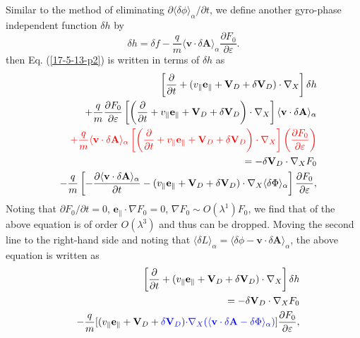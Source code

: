 \documentclass{article}
\newcommand{\tmcolor}[2]{{\color{#1}{#2}}}
\begin{document}
Similar to the method of eliminating $\partial \langle \delta \phi
\rangle_{\alpha} / \partial t$, we define another gyro-phase independent
function $\delta h$ by
\begin{equation}
  \delta h = \delta f - \frac{q}{m} \langle \mathbf{v} \cdot \delta \mathbf{A}
  \rangle_{\alpha} \frac{\partial F_0}{\partial \varepsilon} .
\end{equation}
then Eq. (\ref{17-5-13-p2}) is written in terms of $\delta h$ as
\begin{eqnarray}
  &  & \left[ \frac{\partial}{\partial t} + (v_{\parallel}
  \mathbf{e}_{\parallel} +\mathbf{V}_D + \delta \mathbf{V}_D) \cdot \nabla_X
  \right] \delta h \nonumber\\
  &  & + \frac{q}{m}  \frac{\partial F_0}{\partial \varepsilon} \left[ \left(
  \frac{\partial}{\partial t} + v_{\parallel} \mathbf{e}_{\parallel}
  +\mathbf{V}_D + \delta \mathbf{V}_D \right) \cdot \nabla_X \right] \langle
  \mathbf{v} \cdot \delta \mathbf{A} \rangle_{\alpha} \nonumber\\
  &  & \tmcolor{red}{+ \frac{q}{m} \langle \mathbf{v} \cdot \delta \mathbf{A}
  \rangle_{\alpha} \left[ \left( \frac{\partial}{\partial t} + v_{\parallel}
  \mathbf{e}_{\parallel} +\mathbf{V}_D + \delta \mathbf{V}_D \right) \cdot
  \nabla_X \right] \left( \frac{\partial F_0}{\partial \varepsilon} \right)}
  \nonumber\\
  &  & = - \delta \mathbf{V}_D \cdot \nabla_X F_0 \nonumber\\
  &  & - \frac{q}{m} \left[ - \frac{\partial \langle \mathbf{v} \cdot \delta
  \mathbf{A} \rangle_{\alpha}}{\partial t} - (v_{\parallel}
  \mathbf{e}_{\parallel} +\mathbf{V}_D + \delta \mathbf{V}_D) \cdot \nabla_X
  \langle \delta \Phi \rangle_{\alpha} \right] \frac{\partial F_0}{\partial
  \varepsilon}, 
\end{eqnarray}
Noting that $\partial F_0 / \partial t = 0$, $\mathbf{e}_{\parallel} \cdot
\nabla F_0 = 0$, $\nabla F_0 \sim O (\lambda^1) F_0$, we find that
\tmcolor{red}{the third line} of the above equation is of order $O
(\lambda^3)$ and thus can be dropped. Moving the second line to the right-hand
side and noting that $\langle \delta L \rangle_{\alpha} = \langle \delta \phi
-\mathbf{v} \cdot \delta \mathbf{A} \rangle_{\alpha}$, the above equation is
written as
\begin{eqnarray}
  &  & \left[ \frac{\partial}{\partial t} + (v_{\parallel}
  \mathbf{e}_{\parallel} +\mathbf{V}_D + \delta \mathbf{V}_D) \cdot \nabla_X
  \right] \delta h \nonumber\\
  &  & = - \delta \mathbf{V}_D \cdot \nabla_X F_0 \nonumber\\
  &  & - \frac{q}{m} [(v_{\parallel} \mathbf{e}_{\parallel} +\mathbf{V}_D +
  \tmcolor{blue}{\delta \mathbf{V}_D}) \tmcolor{blue}{\cdot \nabla_X (\langle
  \mathbf{v} \cdot \delta \mathbf{A}- \delta \Phi \rangle_{\alpha})}]
  \frac{\partial F_0}{\partial \varepsilon},  \label{19-1-3-e1}
\end{eqnarray}
\end{document}

